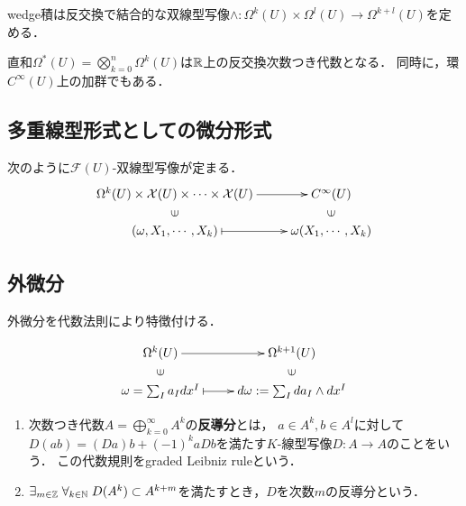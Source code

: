 \documentclass[uplatex,dvipdfmx]{jsreport}
\begin{document}
\begin{lemma}
    wedge積は反交換で結合的な双線型写像$\wedge:\Omega^k(U)\times\Omega^l(U)\to\Omega^{k+l}(U)$を定める．
\end{lemma}

\begin{lemma}
    直和$\Omega^*(U)=\bigotimes^n_{k=0}\Omega^k(U)$は$\mathbb{R}$上の反交換次数つき代数となる．
    同時に，環$C^\infty(U)$上の加群でもある．
\end{lemma}

\subsection{多重線型形式としての微分形式}

\begin{lemma}
    次のように$\mathcal{F}(U)$-双線型写像が定まる．
    \[\xymatrix@R-2pc{
        \Omega^k(U)\times\mathcal{X}(U)\times\cdots\times\mathcal{X}(U)\ar[r]&C^\infty(U)\\
        \rotatebox[origin=c]{90}{$\in$}&\rotatebox[origin=c]{90}{$\in$}\\
        (\omega,X_1,\cdots,X_k)\ar@{|->}[r]&\omega(X_1,\cdots,X_k)
    }\]
\end{lemma}

\subsection{外微分}

\begin{tcolorbox}[colframe=ForestGreen, colback=ForestGreen!10!white,breakable,colbacktitle=ForestGreen!40!white,coltitle=black,fonttitle=\bfseries\sffamily,
title=]
    外微分を代数法則により特徴付ける．
\end{tcolorbox}

\begin{definition}
    \[\xymatrix@R-2pc{
        \Omega^k(U)\ar[r]&\Omega^{k+1}(U)\\
        \rotatebox[origin=c]{90}{$\in$}&\rotatebox[origin=c]{90}{$\in$}\\
        \omega=\sum_Ia_Idx^I\ar@{|->}[r]&d\omega:=\sum_Ida_I\wedge dx^I
    }\]
\end{definition}

\begin{definition}[反導分]\mbox{}
    \begin{enumerate}
        \item 次数つき代数$A=\bigoplus_{k=0}^\infty A^k$の\textbf{反導分}とは，
        $a\in A^k,b\in A^l$に対して$D(ab)=(Da)b+(-1)^kaDb$を満たす$K$-線型写像$D:A\to A$のことをいう．
        この代数規則をgraded Leibniz ruleという．
        \item $\exists_{m\in\mathbb{Z}}\;\forall_{k\in\mathbb{N}}\;D(A^k)\subset A^{k+m}$を満たすとき，$D$を次数$m$の反導分という．
    \end{enumerate}
\end{definition}
\end{document}

